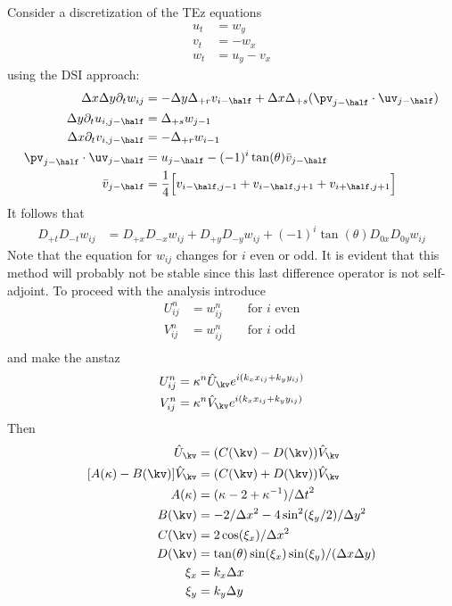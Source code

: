 \documentclass[10pt]{article}
\begin{document}
Consider a discretization of the TEz equations
\begin{align*}
  u_t & = w_y \\
  v_t &= - w_x \\
  w_t &= u_y - v_x
\end{align*}
using the DSI approach:
\begin{align*}
  \dx\dy \partial_t w_{ij} &= -\dy \Delta_{+r} v_{i-\half} 
                     + \dx \Delta_{+s}( \pv_{j-\half}\cdot\uv_{j-\half}) \\
  \dy \partial_t u_{i,j-\half} &= \Delta_{+s} w_{j-1} \\
  \dx \partial_t v_{i,j-\half} &=-\Delta_{+r} w_{i-1} \\
  \pv_{j-\half}\cdot\uv_{j-\half} &= u_{j-\half} - (-1)^i \tan(\theta) \bar{v}_{j-\half} \\
  \bar{v}_{j-\half} &= {1\over4}\Big[ v_{i-\half,j-1} + v_{i-\half,j+1} + v_{i+\half,j+1} \Big]
\end{align*}
It follows that
\begin{align*}
  D_{+t}D_{-t} w_{ij} &= D_{+x}D_{-x} w_{ij} + D_{+y}D_{-y} w_{ij} +(-1)^i\tan(\theta)D_{0x}D_{0y} w_{ij}
\end{align*}
Note that the equation for $w_{ij}$ changes for $i$ even or odd. It is evident that this method will
probably not be stable since this last difference operator is not self-adjoint.
To proceed with the analysis introduce
\begin{align*}
  U_{ij}^n &= w_{ij}^n \qquad\mbox{for $i$ even} \\
  V_{ij}^n &= w_{ij}^n \qquad\mbox{for $i$ odd} \\
\end{align*}
and make the anstaz
\begin{align*}
  U_{ij}^n &= \kappa^n \Uh_\kv e^{i(k_x x_{ij} + k_y y_{ij})} \\
  V_{ij}^n &= \kappa^n \Vh_\kv e^{i(k_x x_{ij} + k_y y_{ij})}
\end{align*}
Then
\begin{align*}
  [ A(\kappa) - B(\kv) ] \Uh_\kv &= ( C(\kv) - D(\kv) ) \Vh_\kv \\ 
  [ A(\kappa) - B(\kv) ] \Vh_\kv &= ( C(\kv) + D(\kv) ) \Vh_\kv \\ 
  A(\kappa) &= (\kappa - 2 + \kappa^{-1})/\dt^2 \\
  B(\kv) &= -2/\dx^2 - 4 \sin^2(\xi_y/2)/\dy^2 \\
  C(\kv) &= 2\cos(\xi_x)/\dx^2 \\
  D(\kv) &= \tan(\theta) \sin(\xi_x)\sin(\xi_y)/(\dx\dy)  \\
  \xi_x &= k_x \dx \\
  \xi_y &= k_y \dy
\end{align*}
\end{document}
